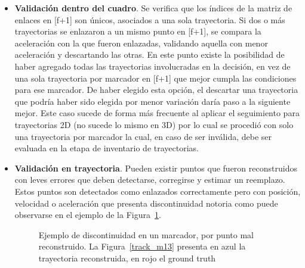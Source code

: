 \begin{itemize}
\item \textbf{Validación dentro del cuadro}. Se verifica que los índices de la matriz de enlaces en [f+1] son únicos, asociados a una sola trayectoria. Si dos o más trayectorias se enlazaron a un mismo punto en [f+1], se compara la aceleración con la que fueron enlazadas, validando aquella con menor aceleración y descartando las otras. En este punto existe la posibilidad de haber agregado todas las trayectorias involucradas en la decisión, en vez de una sola trayectoria por marcador en [f+1] que mejor cumpla las condiciones para ese marcador. De haber elegido esta opción, el descartar una trayectoria que podría haber sido elegida por menor variación daría paso a la siguiente mejor. Este caso sucede de forma más frecuente al aplicar el seguimiento para trayectorias 2D (no sucede lo mismo en 3D) por lo cual se procedió con solo una trayectoria por marcador la cual, en caso de ser inválida, debe ser evaluada en la etapa de inventario de trayectorias.  
\item \textbf{Validación en trayectoria}. Pueden existir puntos que fueron reconstruidos con leves errores que deben detectarse, corregirse y estimar un reemplazo. Estos puntos son detectados como enlazados correctamente pero con posición, velocidad o aceleración que presenta discontinuidad notoria como puede observarse en el ejemplo de la Figura~\ref{discontinuidad_tracking}.

\begin{figure}[ht!]
 \centering
 \caption{Ejemplo de discontinuidad en un marcador, por punto mal reconstruido. La Figura~\ref{track_m13} presenta en azul la trayectoria reconstruida, en rojo el ground truth}
 \label{discontinuidad_tracking}
\end{figure}


\end{itemize}
